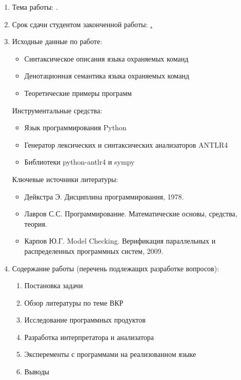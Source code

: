 \begin{enumerate}[1.]
	\item Тема работы: {\expandafter \ulined \thesisTitle.}
	\item Срок сдачи студентом законченной работы: \uline{\thesisDeadline.} 
	\item Исходные данные по работе: 
	\begin{itemize}
		\item Синтаксическое описания языка охраняемых команд
		\item Денотационная семантика языка охраняемых команд
		\item Теоретические примеры программ
	\end{itemize}
	Инструментальные средства:
	\begin{itemize}
		\item Язык программирования Python
		\item Генератор лексических и синтаксических анализаторов ANTLR4
		\item Библиотеки python-antlr4 и sympy
	\end{itemize}
	Ключевые источники литературы:	
	\begin{itemize}
		\item Дейкстра Э. Дисциплина программирования, 1978.
		\item Лавров С.С. Программирование. Математические основы, средства, теория.
		\item Карпов Ю.Г. Model Checking. Верификация параллельных и распределенных программных систем, 2009.
	\end{itemize}
	\printbibliographyTask
	\item Содержание работы (перечень подлежащих разработке вопросов):
	\begin{enumerate}[label=\theenumi\arabic*.]
		\item Постановка задачи
		\item Обзор литературы по теме ВКР
		\item Исследование программных продуктов
		\item Разработка интерпретатора и анализатора
		\item Эксперементы с программами на реализованном языке
		\item Выводы
	\end{enumerate}

\end{enumerate}
